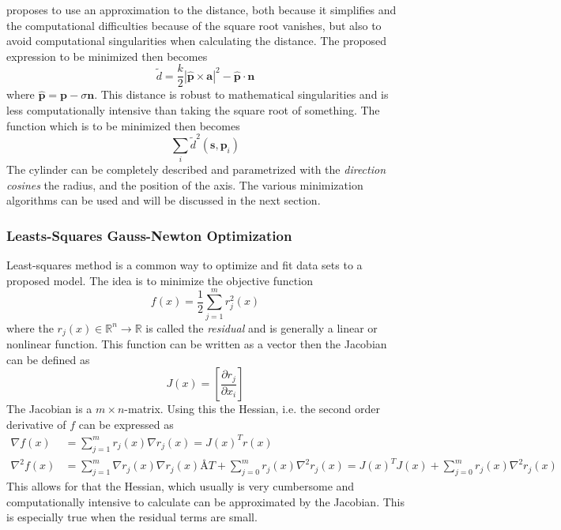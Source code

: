 \cite{ls-fit-cylinder} proposes to use an approximation to the distance, both because it
simplifies and the computational difficulties because of the square root vanishes, but
also to avoid computational singularities when calculating the distance. The proposed
expression to be minimized then becomes
\begin{equation}
    \tilde{d} = \frac{k}{2} |\hat{\mathbf{p}} \times \mathbf{a} | ^2 - \hat{\mathbf{p}} \cdot
    \mathbf{n}
\end{equation}
where $\hat{\mathbf{p}} = \mathbf{p} - \sigma \mathbf{n}$. This distance is robust to
mathematical singularities and is less computationally intensive than taking the square
root of something. The function which is to be minimized then becomes
\begin{equation}
    \label{chap2:eq-ls-cylinder-min}
    \sum_i \tilde{d}^2(\mathbf{s}, \mathbf{p}_i)
\end{equation}
The cylinder can be completely described and parametrized with the \emph{direction cosines} the radius, and
the position of the axis. The various minimization algorithms can be used and will be
discussed in the next section.


\subsubsection{Leasts-Squares Gauss-Newton Optimization}
Least-squares method is a common way to optimize and fit data sets to a proposed model.
The idea is to minimize the objective function 
\begin{equation}
    f(x) = \frac{1}{2} \sum_{j = 1}^m r^2_j (x)
\end{equation}
where the $r_j(x) \in \mathbb{R}^n \rightarrow \mathbb{R}$ is called the \emph{residual} and
is generally a linear or nonlinear function. This function can be written as a vector then
the Jacobian can be defined as
\begin{equation}
    J (x) = \left[ \frac{\partial r_j}{\partial x_i} \right]
\end{equation}
The Jacobian is a $m \times n$-matrix. Using this the Hessian, i.e. the second order
derivative of $f$ can be expressed as
\begin{align}
    \nabla f(x) &= \sum_{j = 1}^m r_j(x) \nabla r_j(x) = J(x)^T r(x) \\
    \nabla^2 f(x) &= \sum_{j=1}^m \nabla r_j (x) \nabla r_j(x)Å T + \sum_{j=0}^m r_j(x)
    \nabla^2 r_j(x) = J(x)^T J(x) + \sum_{j= 0}^m r_j(x) \nabla^2 r_j(x)
    \label{chap2:eq-hessian}
\end{align}
This allows for that the Hessian, which usually is very cumbersome and computationally
intensive to calculate can be approximated by the Jacobian. This is especially true when
the residual terms are small.

